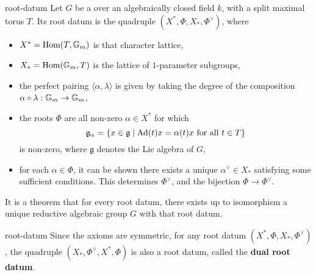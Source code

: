 \begin{example}{root-datum}
    Let $G$ be a  over an algebraically closed field $k$, with a split maximal torus $T$. Its root datum is the quadruple $(X^*, \Phi, X_*, \Phi^\vee)$, where
    \begin{itemize}
        \item $X^* = \operatorname{Hom}(T, \mathbb{G}_m)$ is that character lattice,
        \item $X_* = \operatorname{Hom}(\mathbb{G}_m, T)$ is the lattice of $1$-parameter subgroups,
        \item the perfect pairing $\langle \alpha, \lambda \rangle$ is given by taking the degree of the composition $\alpha \circ \lambda : \mathbb{G}_m \to \mathbb{G}_m$,
        \item the roots $\Phi$ are all non-zero $\alpha \in X^*$ for which
        \[ \mathfrak{g}_\alpha = \{ x \in \mathfrak{g} \mid \textup{Ad}(t) x = \alpha(t) x \textup{ for all } t \in T \} \]
        is non-zero, where $\mathfrak{g}$ denotes the Lie algebra of $G$,
        \item for each $\alpha \in \Phi$, it can be shown there exists a unique $\alpha^\vee \in X_*$ satisfying some sufficient conditions. This determines $\Phi^\vee$, and the bijection $\Phi \to \Phi^\vee$.
    \end{itemize}
    
    It is a theorem that for every root datum, there exists up to isomorphism a unique reductive algebraic group $G$ with that root datum.
\end{example}

\begin{example}{root-datum}
    Since the axioms are symmetric, for any root datum $(X^*, \Phi, X_*, \Phi^\vee)$, the quadruple $(X_*, \Phi^\vee, X^*, \Phi)$ is also a root datum, called the \textbf{dual root datum}.
\end{example}

